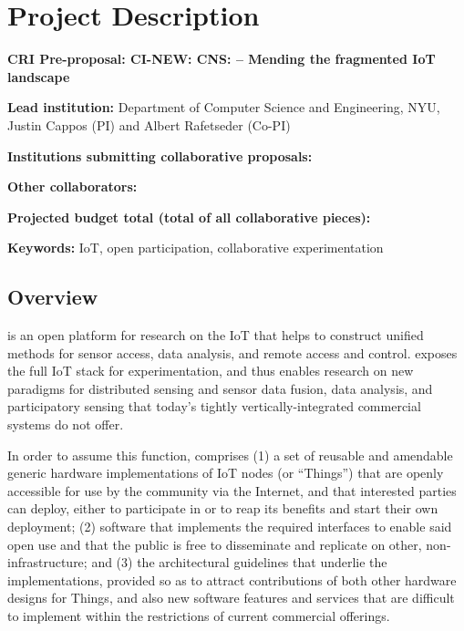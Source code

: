 
\section{Project Description}


\textbf{CRI Pre-proposal: CI-NEW: CNS: \sysname -- Mending the fragmented \acrshort{IoT} landscape}

\textbf{Lead institution:} Department of Computer Science and Engineering, NYU, Justin Cappos (PI) and Albert Rafetseder (Co-PI)

\textbf{Institutions submitting collaborative proposals:} \todo{}

\textbf{Other collaborators:} 

\textbf{Projected budget total (total of all collaborative pieces):} \todo{}

\textbf{Keywords:} \acrlong{IoT}, open participation,
collaborative experimentation


\subsection{Overview}

\sysname is an open platform for research on the \acrfull{IoT}
that helps to construct unified methods for sensor access, data analysis,
and remote access and control. \sysname exposes the full \gls{IoT}
stack for experimentation, and thus enables research on new paradigms
for distributed sensing and sensor data fusion, data analysis, and
participatory sensing that today's tightly vertically-integrated
commercial systems do not offer.

In order to assume this function, \sysname comprises
(1) a set of reusable and amendable generic hardware implementations of
\gls{IoT} nodes (or ``Things'') that are openly accessible for
use by the community via the Internet, and that interested parties
can deploy, either to participate in \sysname or to reap its benefits
and start their own deployment;
(2) software that implements the required interfaces to
enable said open use and that the public is free to disseminate
and replicate on other, non-\sysname infrastructure; and
(3) the architectural guidelines that underlie the implementations,
provided so as to attract contributions of both other hardware
designs for Things, and also new software features and services
that are difficult to implement within the restrictions of current
commercial offerings.

